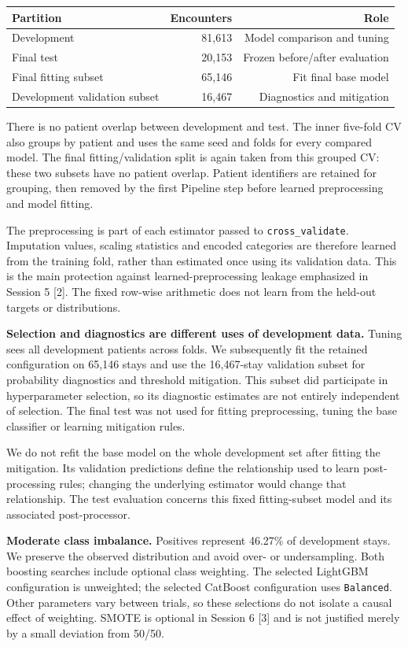 \documentclass[11pt,a4paper]{article}
\begin{document}
\begin{center}\begin{tabular}{lrr}\toprule
Partition & Encounters & Role\\\midrule
Development & 81,613 & Model comparison and tuning\\
Final test & 20,153 & Frozen before/after evaluation\\\midrule
Final fitting subset & 65,146 & Fit final base model\\
Development validation subset & 16,467 & Diagnostics and mitigation\\\bottomrule
\end{tabular}\end{center}
There is no patient overlap between development and test. The inner five-fold CV also groups by patient and uses the same seed and folds for every compared model. The final fitting/validation split is again taken from this grouped CV: these two subsets have no patient overlap. Patient identifiers are retained for grouping, then removed by the first Pipeline step before learned preprocessing and model fitting.

The preprocessing is part of each estimator passed to \texttt{cross\_validate}. Imputation values, scaling statistics and encoded categories are therefore learned from the training fold, rather than estimated once using its validation data. This is the main protection against learned-preprocessing leakage emphasized in Session 5 [2]. The fixed row-wise arithmetic does not learn from the held-out targets or distributions.

\textbf{Selection and diagnostics are different uses of development data.} Tuning sees all development patients across folds. We subsequently fit the retained configuration on 65,146 stays and use the 16,467-stay validation subset for probability diagnostics and threshold mitigation. This subset did participate in hyperparameter selection, so its diagnostic estimates are not entirely independent of selection. The final test was not used for fitting preprocessing, tuning the base classifier or learning mitigation rules.

We do not refit the base model on the whole development set after fitting the mitigation. Its validation predictions define the relationship used to learn post-processing rules; changing the underlying estimator would change that relationship. The test evaluation concerns this fixed fitting-subset model and its associated post-processor.

\textbf{Moderate class imbalance.} Positives represent 46.27\% of development stays. We preserve the observed distribution and avoid over- or undersampling. Both boosting searches include optional class weighting. The selected LightGBM configuration is unweighted; the selected CatBoost configuration uses \texttt{Balanced}. Other parameters vary between trials, so these selections do not isolate a causal effect of weighting. SMOTE is optional in Session 6 [3] and is not justified merely by a small deviation from 50/50.
\end{document}
